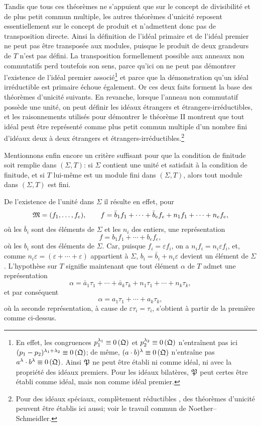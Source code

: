 Tandis que tous ces théorèmes ne s'appuient que sur le concept de divisibilité et de plus petit commun multiple, les autres théorèmes d'unicité reposent essentiellement sur le concept de produit et n'admettent donc pas de transposition directe. Ainsi la définition de l'idéal primaire et de l'idéal premier ne peut pas être transposée aux modules, puisque le produit de deux grandeurs de $T$ n'est pas défini. La transposition formellement possible aux anneaux non commutatifs perd toutefois son sens, parce qu'ici on ne peut pas démontrer l'existence de l'idéal premier associé\footnote{En effet, les congruences $p_1^{\lambda_1}\equiv 0\,(\mathfrak{Q})$ et $p_2^{\lambda_2}\equiv 0\,(\mathfrak{Q})$ n'entraînent pas ici $(p_1-p_2)^{\lambda_1+\lambda_2}\equiv 0\,(\mathfrak{Q})$; de même, $(a\cdot b)^\lambda\equiv 0\,(\mathfrak{Q})$ n'entraîne pas $a^\lambda\cdot b^\lambda\equiv 0\,(\mathfrak{Q})$. Ainsi $\mathfrak{P}$ ne peut être établi ni comme idéal, ni avec la propriété des idéaux premiers. Pour les idéaux bilatères, $\mathfrak{P}$ peut certes être établi comme idéal, mais non comme idéal premier.} et parce que la démonstration qu'un idéal irréductible est primaire échoue également. Or ces deux faits forment la base des théorèmes d'unicité suivants. En revanche, lorsque l'anneau non commutatif possède une unité, on peut définir les idéaux étrangers et étrangers-irréductibles, et les raisonnements utilisés pour démontrer le théorème II montrent que tout idéal peut être représenté comme plus petit commun multiple d'un nombre fini d'idéaux deux à deux étrangers et étrangers-irréductibles.\footnote{Pour des idéaux spéciaux, \og complètement réductibles \fg{}, des théorèmes d'unicité peuvent être établis ici aussi; voir le travail commun de Noether--Schmeidler.}

Mentionnons enfin encore un critère suffisant pour que la condition de finitude soit remplie dans $(\Sigma,T)$: si $\Sigma$ contient une unité et satisfait à la condition de finitude, et si $T$ lui-même est un module fini dans $(\Sigma,T)$, alors tout module dans $(\Sigma,T)$ est fini.

De l'existence de l'unité dans $\Sigma$ il résulte en effet, pour
\[
 \mathfrak{M}=(f_1,
\ldots,f_e),\qquad
 f=\bar b_1f_1+\cdots+\bar b_ef_e+n_1f_1+\cdots+n_ef_e,
\]
où les $\bar b_i$ sont des éléments de $\Sigma$ et les $n_i$ des entiers, une représentation
\[
 f=b_1f_1+\cdots+b_ef_e,
\]
où les $b_i$ sont des éléments de $\Sigma$. Car, puisque $f_i=\varepsilon f_i$, on a $n_if_i=n_i\varepsilon f_i$, et, comme $n_i\varepsilon=(\varepsilon+\cdots+\varepsilon)$ appartient à $\Sigma$, $b_i=\bar b_i+n_i\varepsilon$ devient un élément de $\Sigma$. L'hypothèse sur $T$ signifie maintenant que tout élément $\alpha$ de $T$ admet une représentation
\[
 \alpha=\bar a_1\tau_1+\cdots+\bar a_k\tau_k+n_1\tau_1+\cdots+n_k\tau_k,
\]
et par conséquent
\[
 \alpha=a_1\tau_1+\cdots+a_k\tau_k,
\]
où la seconde représentation, à cause de $\varepsilon\tau_i=\tau_i$, s'obtient à partir de la première comme ci-dessus.

